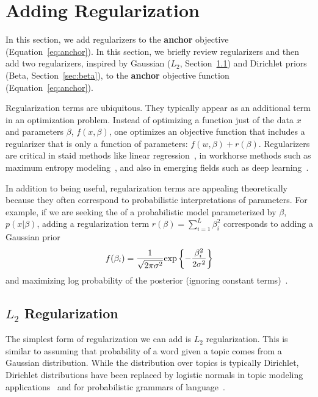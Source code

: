 \section{Adding Regularization}
\label{sec:prior}

In this section, we add regularizers to the {\bf anchor} objective
(Equation~\ref{eq:anchor}).  In this section, we briefly review regularizers and
then add two regularizers, inspired by Gaussian ($L_2$, Section~\ref{sec:l2})
and Dirichlet priors (Beta, Section~\ref{sec:beta}), to the {\bf anchor}
objective function (Equation~\ref{eq:anchor}).

Regularization terms are ubiquitous.  They typically appear as an
additional term in an optimization problem.  Instead of optimizing a
function just of the data $x$ and parameters $\beta$, $f(x, \beta)$,
one optimizes an objective function that includes a regularizer that
is only a function of parameters: $f(w, \beta) + r(\beta)$.
Regularizers are critical in staid methods like linear
regression~\cite{ng-04}, in workhorse methods such as maximum entropy
modeling~\cite{dudik-04}, and also in emerging fields such as deep
learning~\cite{wager-13}.

In addition to being useful, regularization terms are appealing
theoretically because they often correspond to probabilistic
interpretations of parameters.  For example, if we are seeking the
 of a probabilistic model parameterized by $\beta$, $p(x|
\beta)$, adding a regularization term $r(\beta) = \sum_{i=1}^L
\beta_i^2$ corresponds to adding a Gaussian prior
\begin{equation}
f(\beta_i) = \frac{1}{\sqrt{2\pi\sigma^2}} \mbox{exp}\left\{ -\frac{\beta_i^2}{2\sigma^2}\right\}
\end{equation}
and maximizing log probability of the posterior (ignoring constant
terms)~\cite{Rennie03onl2-norm}.

\subsection{$L_2$ Regularization}
\label{sec:l2}

The simplest form of regularization we can add is $L_2$
regularization.  This is similar to assuming that probability of a
word given a topic comes from a Gaussian distribution.  While the
distribution over topics is typically Dirichlet, Dirichlet
distributions have been replaced by logistic normals in topic modeling
applications~\cite{blei-06} and for probabilistic grammars of
language~\cite{cohen-09}.

